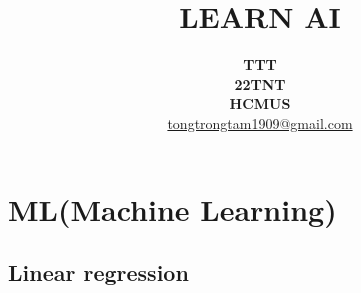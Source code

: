 \documentclass[final,letterpaper,twoside,12pt]{report}
\begin{document}
\title{\bf \color{azure(colorwheel)} \Huge LEARN AI}
\date{}
\author{ \textbf{TTT}\\\textbf{22TNT}\\\textbf{HCMUS}\\\href{mailto:tongtrongtam1909@gmail.com?subject=Inbox}{tongtrongtam1909@gmail.com}}
\maketitle

\dominitoc
\tableofcontents


\part{ML(Machine Learning)}
\setcounter{chapter}{0}

\chapter{Linear regression}
\end{document}
